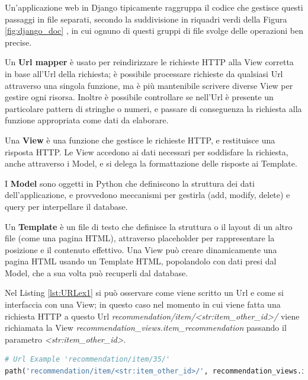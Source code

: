 \hfill\break
Un'applicazione web in Django tipicamente raggruppa il codice che gestisce questi passaggi in file separati, secondo la 
suddivisione in riquadri verdi della Figura \ref{fig:django_doc} \cite{mdn-django-documentation}, in cui ognuno di questi
gruppi di file svolge delle operazioni ben precise.
\begin{description}
    \item Un \textbf{Url mapper} è usato per reindirizzare le richieste HTTP alla View corretta in base all'Url della richiesta; è possibile processare 
    richieste da qualsiasi Url attraverso una singola funzione, ma è più mantenibile scrivere diverse View per gestire ogni risorsa. 
    Inoltre è possibile controllare se nell'Url è presente un particolare pattern di stringhe o numeri, e passare di conseguenza la richiesta alla 
    funzione appropriata come dati da elaborare.
    \item Una \textbf{View} è una funzione che gestisce le richieste HTTP, e restituisce una risposta HTTP. Le View accedono ai dati necessari per soddisfare la 
    richiesta, anche attraverso i Model, e si delega la formattazione delle risposte ai Template.
    \item I \textbf{Model} sono oggetti in Python che definiscono la struttura dei dati dell'applicazione, e provvedono meccanismi per gestirla (add, modify, 
    delete) e query per interpellare il database.
    \item Un \textbf{Template} è un file di testo che definisce la struttura o il layout di un altro file (come una pagina HTML), attraverso placeholder per
    rappresentare la posizione e il contenuto effettivo. Una View può creare dinamicamente una pagina HTML usando un Template HTML, popolandolo con dati presi dal Model, 
    che a sua volta può recuperli dal database.
\end{description}
Nel Listing \ref{lst:URLex1} si può osservare come viene scritto un Url e come si interfaccia con una View; in questo caso nel 
momento in cui viene fatta una richiesta HTTP a questo Url \textit{recommendation/item/<str:item\_other\_id>/} viene richiamata la 
View \textit{recommendation\_views.item\_recommendation} passando il parametro \textit{<str:item\_other\_id>}.
\lstset{style=python_code_style}
\begin{lstlisting}[language=Python, label=lst:URLex1]
# Url Example 'recommendation/item/35/'
path('recommendation/item/<str:item_other_id>/', recommendation_views.item_recommendation, name='item_recommendation')
\end{lstlisting}
